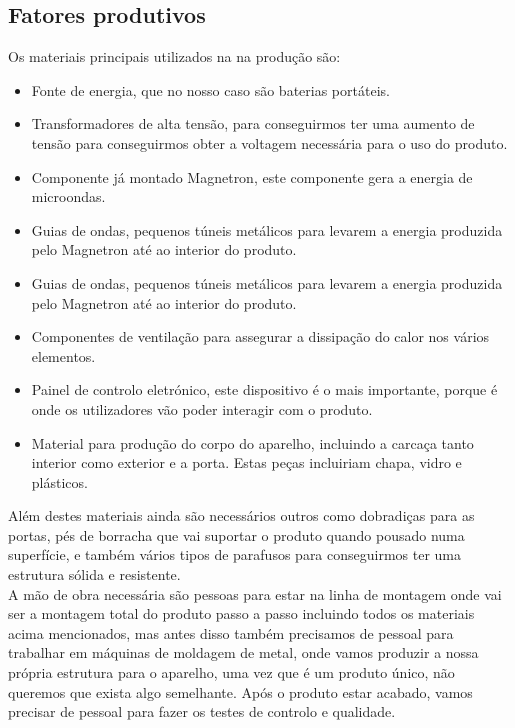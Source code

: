 \documentclass[a4paper]{article}
\begin{document}
\subsection{Fatores produtivos}
Os materiais principais utilizados na na produção são:
\begin{itemize}
    \item Fonte de energia, que no nosso caso são baterias portáteis.
    \item Transformadores de alta tensão, para conseguirmos ter uma aumento de tensão para conseguirmos obter a voltagem necessária para o uso do produto.
    \item Componente já montado Magnetron, este componente gera a energia de microondas.
    \item Guias de ondas, pequenos túneis metálicos para levarem a energia produzida pelo Magnetron até ao interior do produto.
    \item Guias de ondas, pequenos túneis metálicos para levarem a energia produzida pelo Magnetron até ao interior do produto.
    \item Componentes de ventilação para assegurar a dissipação do calor nos vários elementos.
    \item Painel de controlo eletrónico, este dispositivo é o mais importante, porque é onde os utilizadores vão poder interagir com o produto.
    \item Material para produção do corpo do aparelho, incluindo a carcaça tanto interior como exterior e a porta. Estas peças incluiriam chapa, vidro e plásticos.
\end{itemize}
Além destes materiais ainda são necessários outros como dobradiças para as portas, pés de borracha que vai suportar o produto quando pousado numa superfície, e também vários tipos de parafusos para conseguirmos ter uma estrutura sólida e resistente.\\
A mão de obra necessária são pessoas para estar na linha de montagem onde vai ser a montagem total do produto passo a passo incluindo todos os materiais acima mencionados, mas antes disso também precisamos de pessoal para trabalhar em máquinas de moldagem de metal, onde vamos produzir a nossa própria estrutura para o aparelho, uma vez que é um produto único, não queremos que exista algo semelhante. Após o produto estar acabado, vamos precisar de pessoal para fazer os testes de controlo e qualidade.
\end{document}
